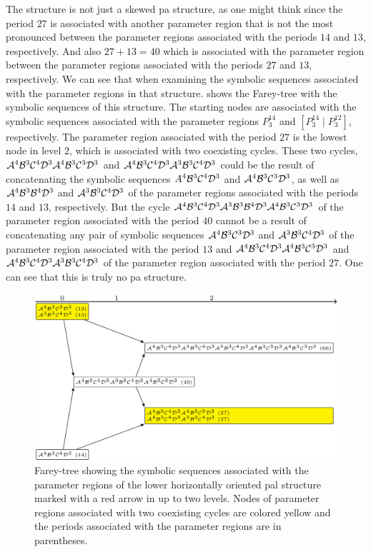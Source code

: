 The structure is not just a skewed \gls{pa} structure, as one might think since the period $27$ is associated with another parameter region that is not the most pronounced between the parameter regions associated with the periods $14$ and $13$, respectively.
And also $27 + 13 = 40$ which is associated with the parameter region between the parameter regions associated with the periods $27$ and $13$, respectively.
We can see that when examining the symbolic sequences associated with the parameter regions in that structure.
 shows the Farey-tree with the symbolic sequences of this structure.
The starting nodes are associated with the symbolic sequences associated with the parameter regions $P^{14}_3$ and $\left[P^{14}_3 \mid P^{12}_3\right]$, respectively.
The parameter region associated with the period $27$ is the lowest node in level $2$, which is associated with two coexisting cycles.
These two cycles, $\mathcal{A}^4\mathcal{B}^3\mathcal{C}^4\mathcal{D}^3\mathcal{A}^4\mathcal{B}^3\mathcal{C}^3\mathcal{D}^3$ and $\mathcal{A}^4\mathcal{B}^3\mathcal{C}^4\mathcal{D}^3\mathcal{A}^3\mathcal{B}^3\mathcal{C}^4\mathcal{D}^3$ could be the result of concatenating the symbolic sequences $A^4\mathcal{B}^3\mathcal{C}^4\mathcal{D}^3$ and $\mathcal{A}^4\mathcal{B}^3\mathcal{C}^3\mathcal{D}^3$, as well as $\mathcal{A}^4\mathcal{B}^3\mathcal{B}^4\mathcal{D}^3$ and $\mathcal{A}^3\mathcal{B}^3\mathcal{C}^4\mathcal{D}^3$ of the parameter regions associated with the periods $14$ and $13$, respectively.
But the cycle $\mathcal{A}^4\mathcal{B}^3\mathcal{C}^4\mathcal{D}^3\mathcal{A}^3\mathcal{B}^3\mathcal{B}^4\mathcal{D}^3\mathcal{A}^4\mathcal{B}^3\mathcal{C}^3\mathcal{D}^3$ of the parameter region associated with the period $40$ cannot be a result of concatenating any pair of symbolic sequences $\mathcal{A}^4\mathcal{B}^3\mathcal{C}^3\mathcal{D}^3$ and $\mathcal{A}^3\mathcal{B}^3\mathcal{C}^4\mathcal{D}^3$ of the parameter region associated with the period $13$ and $\mathcal{A}^4\mathcal{B}^3\mathcal{C}^4\mathcal{D}^3\mathcal{A}^4\mathcal{B}^3\mathcal{C}^3\mathcal{D}^3$ and $\mathcal{A}^4\mathcal{B}^3\mathcal{C}^4\mathcal{D}^3\mathcal{A}^3\mathcal{B}^3\mathcal{C}^4\mathcal{D}^3$ of the parameter region associated with the period $27$.
One can see that this is truly no \gls{pa} structure.

\begin{figure}
	\centering
	\includegraphics[width=.7 \textwidth]{../Figures/7/7.13/adding.png}
	\caption[Farey-tree showing the symbolic sequences associated with the parameter regions of a horizontally oriented  structure]{
		Farey-tree showing the symbolic sequences associated with the parameter regions of the lower horizontally oriented \gls{pal} structure marked with a red arrow in  up to two levels.
		Nodes of parameter regions associated with two coexisting cycles are colored yellow and the periods associated with the parameter regions are in parentheses.
	}
	\label{fig:add.add.like.hor.tree}
\end{figure}

